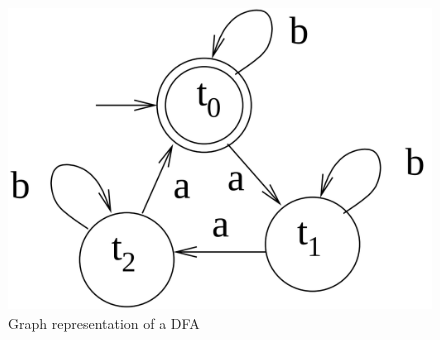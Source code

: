 \begin{figure}
\begin{center}
  \includegraphics[scale=0.17]{./images/CA_FDM/amod3Automata}
  \caption{Graph representation of a DFA}
  \label{amod3Automata}
\end{center}
\end{figure}



